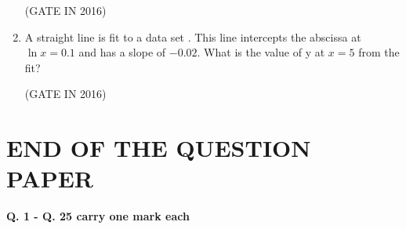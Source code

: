 \documentclass[journal,12pt,onecolumn]{IEEEtran}
\theoremstyle{remark}
\begin{document}
\begin{enumerate}
\hfill{(GATE IN 2016)}
\begin{enumerate}
\end{enumerate}

\item A straight line is fit to a data set . This line intercepts the abscissa at $\ln x = 0.1$ and has a slope of $-0.02$. What is the value of y at $x = 5$ from the fit?

\hfill{(GATE IN 2016)}
\begin{enumerate}
\end{enumerate}

\end{enumerate}

\section*{END OF THE QUESTION PAPER }


\textbf{Q. 1 - Q. 25 carry one mark each}
\end{document}
